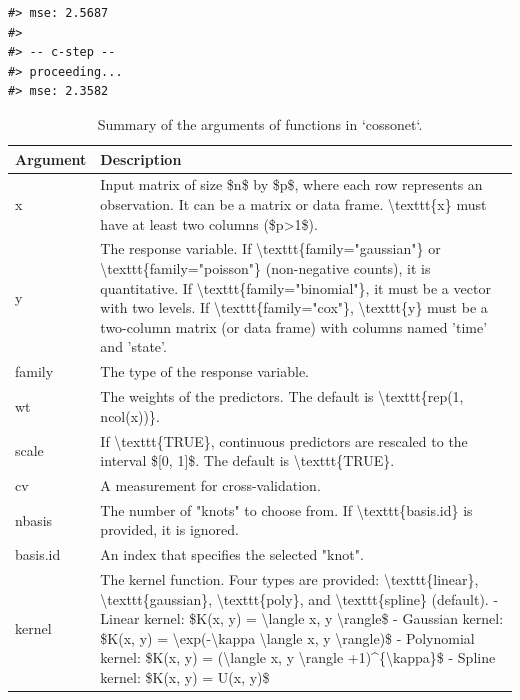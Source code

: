 \begin{verbatim}
#> mse: 2.5687 
#> 
#> -- c-step -- 
#> proceeding... 
#> mse: 2.3582
\end{verbatim}

\begin{table}
\centering
\caption{\label{tab:tab-function-latex}Summary of the arguments of functions in `cossonet`.}
\centering
\begin{tabular}[t]{l|l}
\hline
Argument & Description\\
\hline
x & Input matrix of size \$n\$ by \$p\$, where each row represents an observation. It can be a matrix or data frame. \textbackslash{}texttt\{x\} must have at least two columns (\$p>1\$).\\
\hline
y & The response variable. If \textbackslash{}texttt\{family="gaussian"\} or \textbackslash{}texttt\{family="poisson"\} (non-negative counts), it is quantitative. If \textbackslash{}texttt\{family="binomial"\}, it must be a vector with two levels. If \textbackslash{}texttt\{family="cox"\}, \textbackslash{}texttt\{y\} must be a two-column matrix (or data frame) with columns named 'time' and 'state'.\\
\hline
family & The type of the response variable.\\
\hline
wt & The weights of the predictors. The default is \textbackslash{}texttt\{rep(1, ncol(x))\}.\\
\hline
scale & If \textbackslash{}texttt\{TRUE\}, continuous predictors are rescaled to the interval \$[0, 1]\$. The default is \textbackslash{}texttt\{TRUE\}.\\
\hline
cv & A measurement for cross-validation.\\
\hline
nbasis & The number of "knots" to choose from. If \textbackslash{}texttt\{basis.id\} is provided, it is ignored.\\
\hline
basis.id & An index that specifies the selected "knot".\\
\hline
kernel & The kernel function. Four types are provided: \textbackslash{}texttt\{linear\}, \textbackslash{}texttt\{gaussian\}, \textbackslash{}texttt\{poly\}, and \textbackslash{}texttt\{spline\} (default). - Linear kernel: \$K(x, y) = \textbackslash{}langle x, y \textbackslash{}rangle\$ - Gaussian kernel: \$K(x, y) = \textbackslash{}exp(-\textbackslash{}kappa \textbackslash{}langle x, y \textbackslash{}rangle)\$ - Polynomial kernel: \$K(x, y) = (\textbackslash{}langle x, y \textbackslash{}rangle +1)\textasciicircum{}\{\textbackslash{}kappa\}\$ - Spline kernel: \$K(x, y) = U(x, y)\$\\

\end{tabular}
\end{table}
